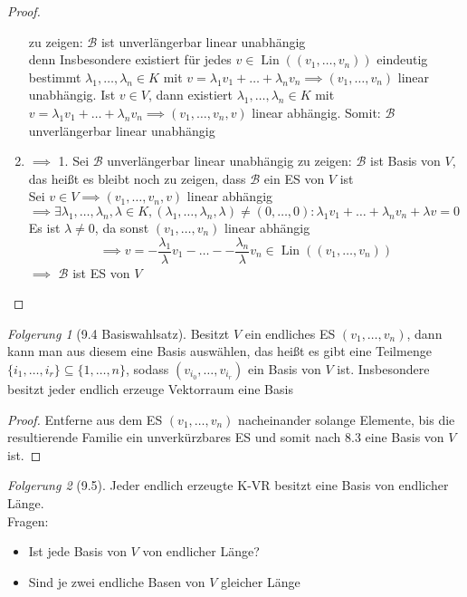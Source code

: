 \documentclass[a4paper]{scrartcl}
\DeclareMathOperator{\Exists}{\exists}
\DeclareMathOperator{\Lin}{Lin}
\theoremstyle{definition}
\theoremstyle{plain}
\theoremstyle{plain}
\theoremstyle{remark}
\theoremstyle{remark}
\theoremstyle{remark}
\newtheorem{conc}{Folgerung}
\theoremstyle{remark}
\theoremstyle{remark}
\begin{document}
\begin{proof}
\begin{enumerate}
         zu zeigen: $\mathcal{B}$ ist unverlängerbar linear unabhängig \\
         denn Insbesondere existiert für jedes $v\in \Lin((v_1, \ldots, v_n))$ eindeutig bestimmt $\lambda_1, \ldots, \lambda_n \in K$ mit $v = \lambda_1 v_1 + \ldots + \lambda_n v_n \implies (v_1,\ldots, v_n)$ linear unabhängig.
Ist $v\in V$, dann existiert $\lambda_1, \ldots, \lambda_n \in K$ mit $v = \lambda_1 v_1 + \ldots + \lambda_n v_n \implies (v_1, \ldots, v_n, v)$ linear abhängig. Somit: $\mathcal{B}$ unverlängerbar linear unabhängig
\item $\implies$ 1. Sei $\mathcal{B}$ unverlängerbar linear unabhängig
zu zeigen: $\mathcal{B}$ ist Basis von $V$, das heißt es bleibt noch zu zeigen, dass $\mathcal{B}$ ein ES von $V$ ist \\
         Sei $v\in V \implies (v_1, \ldots, v_n, v)$ linear abhängig $\implies \Exists \lambda_1, \ldots, \lambda_n, \lambda \in K, (\lambda_1, \ldots, \lambda_n, \lambda) \neq (0, \ldots, 0): \lambda_1 v_1 + \ldots + \lambda_n v_n + \lambda v = 0$
Es ist $\lambda \neq 0$, da sonst $(v_1, \ldots, v_n)$ linear abhängig
\[\implies v = -\frac{\lambda_1}{\lambda} v_1 - \ldots - -\frac{\lambda_n}{\lambda} v_n \in \Lin((v_1, \ldots, v_n))\]
$\implies$ $\mathcal{B}$ ist ES von $V$
\end{enumerate}
\end{proof}
\begin{conc}[9.4 Basiswahlsatz]
Besitzt $V$ ein endliches ES $(v_1, \ldots, v_n)$, dann kann man aus diesem eine Basis auswählen, das heißt es gibt eine Teilmenge $\{i_1, \ldots, i_r\} \subseteq \{1, \ldots, n\}$, sodass $(v_{i_0}, \ldots, v_{i_r})$ ein Basis von $V$ ist. Insbesondere besitzt jeder endlich erzeuge Vektorraum eine Basis
\end{conc}
\begin{proof}
Entferne aus dem ES $(v_1, \ldots, v_n)$ nacheinander solange Elemente, bis die resultierende Familie ein unverkürzbares ES und somit nach 8.3 eine Basis von $V$ ist.
\end{proof}
\begin{conc}[9.5]
Jeder endlich erzeugte K-VR besitzt eine Basis von endlicher Länge. \\
  Fragen:
\begin{itemize}
\item Ist jede Basis von $V$ von endlicher Länge?
\item Sind je zwei endliche Basen von $V$ gleicher Länge
\end{itemize}
\end{conc}
\end{document}
